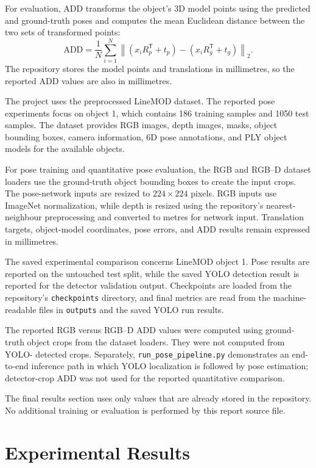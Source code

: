 \documentclass[11pt,a4paper]{article}
\begin{document}
For evaluation, ADD transforms the object's 3D model points using the predicted
and ground-truth poses and computes the mean Euclidean distance between the two
sets of transformed points:
\begin{equation}
    \mathrm{ADD}
    = \frac{1}{N}\sum_{i=1}^{N}
    \left\|\left(x_iR_{p}^{\mathsf{T}}+t_{p}\right)
    -\left(x_iR_{g}^{\mathsf{T}}+t_{g}\right)\right\|_2.
\end{equation}
The repository stores the model points and translations in millimetres, so the
reported ADD values are also in millimetres.

The project uses the preprocessed LineMOD dataset. The reported pose
experiments focus on object 1, which contains 186 training samples and 1050
test samples. The dataset provides RGB images, depth images, masks, object
bounding boxes, camera information, 6D pose annotations, and PLY object models
for the available objects.

For pose training and quantitative pose evaluation, the RGB and RGB--D dataset
loaders use the ground-truth object bounding boxes to create the input crops.
The pose-network inputs are resized to $224\times224$ pixels. RGB inputs use
ImageNet normalization, while depth is resized using the repository's
nearest-neighbour preprocessing and converted to metres for network input.
Translation targets, object-model coordinates, pose errors, and ADD results
remain expressed in millimetres.

The saved experimental comparison concerns LineMOD object 1. Pose results are
reported on the untouched test split, while the saved YOLO detection result is
reported for the detector validation output. Checkpoints are loaded from the
repository's \texttt{checkpoints} directory, and final metrics are read from
the machine-readable files in \texttt{outputs} and the saved YOLO run results.

The reported RGB versus RGB--D ADD values were computed using ground-truth
object crops from the dataset loaders. They were not computed from YOLO-
detected crops. Separately, \texttt{run\_pose\_pipeline.py} demonstrates an
end-to-end inference path in which YOLO localization is followed by pose
estimation; detector-crop ADD was not used for the reported quantitative
comparison.

The final results section uses only values that are already stored in the
repository. No additional training or evaluation is performed by this report
source file.

\section{Experimental Results}\label{sec:experimental-results}
\end{document}

